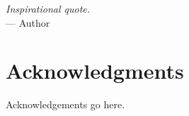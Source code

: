 
\begin{flushright}{
	\slshape
	Inspirational quote.} \\ \medskip
	--- Author
\end{flushright}



\bigskip

\begingroup
	\let\clearpage\relax
	\let\cleardoublepage\relax
	\let\cleardoublepage\relax
	\chapter*{Acknowledgments}
		Acknowledgements go here.

\endgroup
